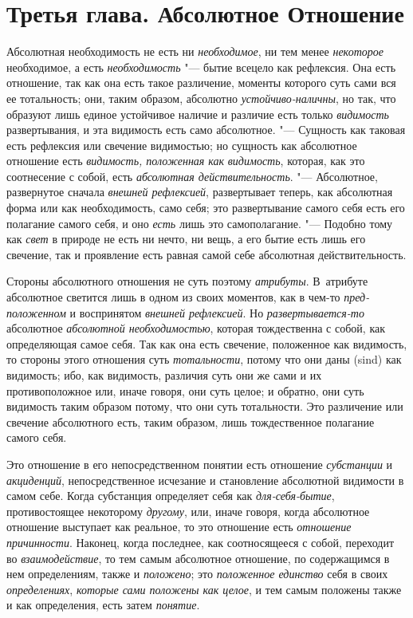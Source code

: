 \chapter[{\em Третья глава} Абсолютное Отношение]{Третья глава. Абсолютное Отношение}

Абсолютная необходимость не есть ни {\em необходимое}, ни тем менее
{\em некоторое} необходимое, а есть
{\em необходимость} "--- бытие всецело как рефлексия. Она
есть отношение, так как она есть такое различение, моменты которого суть
сами вся ее тотальность; они, таким образом, абсолютно
{\em устойчиво-наличны}, но так, что образуют лишь
единое устойчивое наличие и различие есть только
{\em видимость} развертывания, и эта видимость есть
само абсолютное. "--- Сущность как таковая есть рефлексия или свечение
видимостью; но сущность как абсолютное отношение есть
{\em видимость, положенная как
}{\em видимость}, которая, как это соотнесение с собой,
есть {\em абсолютная действительность}. "--- Абсолютное,
развернутое сначала {\em внешней рефлексией},
развертывает теперь, как абсолютная форма или как необходимость, само себя;
это развертывание самого себя есть его полагание самого себя, и оно
{\em есть} лишь это самополагание. "--- Подобно тому как
{\em свет} в природе не есть ни нечто, ни вещь, а его
бытие есть лишь его свечение, так и проявление есть равная самой себе
абсолютная действительность.

Стороны абсолютного отношения не суть поэтому
{\em атрибуты}. В~атрибуте абсолютное светится лишь в
одном из своих моментов, как в чем-то {\em пред-положенном} и воспринятом
{\em внешней рефлексией}. Но {\em развертывается-то} абсолютное
{\em абсолютной необходимостью}, которая тождественна с
собой, как определяющая самое себя. Так как она есть свечение, положенное
как видимость, то стороны этого отношения суть
{\em тотальности}, потому что они даны (sind) как
видимость; ибо, как видимость, различия суть они же сами и их
противоположное или, иначе говоря, они суть целое; и обратно, они суть
видимость таким образом потому, что они суть тотальности. Это различение
или свечение абсолютного есть, таким образом, лишь тождественное полагание
самого себя.

Это отношение в его непосредственном понятии есть отношение
{\em субстанции} и
{\em акциденций}, непосредственное исчезание и
становление абсолютной видимости в самом себе. Когда субстанция определяет
себя как {\em для-себя-бытие}, противостоящее
некоторому {\em другому}, или, иначе говоря, когда
абсолютное отношение выступает как реальное, то это отношение есть
{\em отношение причинности}. Наконец, когда последнее,
как соотносящееся с собой, переходит во
{\em взаимодействие}, то тем самым абсолютное
отношение, по содержащимся в нем определениям, также и
{\em положено}; это {\em положенное
единство} себя в своих {\em определениях},
{\em которые сами положены как целое}, и тем самым
положены также и как определения, есть затем
{\em понятие}.


